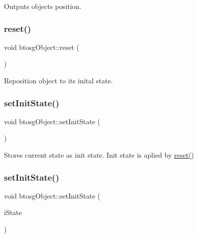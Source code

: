 Outputs object\textquotesingle{}s position. \mbox{\label{classbtosgObject_a93983f9180dd0672f8779cf2baa78580}} 
\subsubsection{\texorpdfstring{reset()}{reset()}}
{\footnotesize\ttfamily void btosg\+Object\+::reset (\begin{DoxyParamCaption}{ }\end{DoxyParamCaption})}

Reposition object to its inital state. \mbox{\label{classbtosgObject_ad1508a0ce28cfac83e5f0ff6245f91b5}} 
\subsubsection{\texorpdfstring{setInitState()}{setInitState()}\hspace{0.1cm}{\footnotesize\ttfamily [1/2]}}
{\footnotesize\ttfamily void btosg\+Object\+::set\+Init\+State (\begin{DoxyParamCaption}{ }\end{DoxyParamCaption})\hspace{0.3cm}{\ttfamily [inline]}}

Stores current state as init state. Init state is aplied by \mbox{\hyperlink{classbtosgObject_a93983f9180dd0672f8779cf2baa78580}{reset()}} \mbox{\label{classbtosgObject_a6ceb08e59ee95acaaef389ee198d2b56}} 
\subsubsection{\texorpdfstring{setInitState()}{setInitState()}\hspace{0.1cm}{\footnotesize\ttfamily [2/2]}}
{\footnotesize\ttfamily void btosg\+Object\+::set\+Init\+State (\begin{DoxyParamCaption}\item[{bt\+Transform}]{i\+State }\end{DoxyParamCaption})\hspace{0.3cm}{\ttfamily [inline]}}

